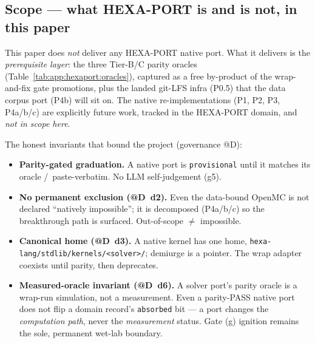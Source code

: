 \subsection{Scope --- what HEXA-PORT is and is not, in this paper}
\label{app:hexaport:scope}

This paper does \emph{not} deliver any HEXA-PORT native port. What it
delivers is the \emph{prerequisite layer}: the three Tier-B/C parity
oracles (Table~\ref{tab:app:hexaport:oracles}), captured as a free
by-product of the wrap-and-fix gate promotions, plus the landed
git-LFS infra (P0.5) that the data corpus port (P4b) will sit on. The
native re-implementations (P1, P2, P3, P4a/b/c) are explicitly future
work, tracked in the HEXA-PORT domain, and \emph{not in scope here}.

The honest invariants that bound the project (governance @D):
\begin{itemize}\itemsep0.2em
\item \textbf{Parity-gated graduation.} A native port is
\texttt{provisional} until it matches its oracle \tierGreen/\tierBlue\
paste-verbatim. No LLM self-judgement (g5).
\item \textbf{No permanent exclusion (@D~d2).} Even the data-bound
OpenMC is not declared ``natively impossible''; it is decomposed
(P4a/b/c) so the breakthrough path is surfaced. Out-of-scope $\neq$
impossible.
\item \textbf{Canonical home (@D~d3).} A native kernel has one home,
\texttt{hexa-lang/stdlib/kernels/<solver>/}; demiurge is a pointer.
The wrap adapter coexists until parity, then deprecates.
\item \textbf{Measured-oracle invariant (@D~d6).} A solver port's
parity oracle is a wrap-run simulation, not a measurement. Even a
parity-PASS native port does not flip a domain record's
\texttt{absorbed} bit --- a port changes the \emph{computation path},
never the \emph{measurement} status. Gate (g) ignition remains the
sole, permanent wet-lab boundary.
\end{itemize}
